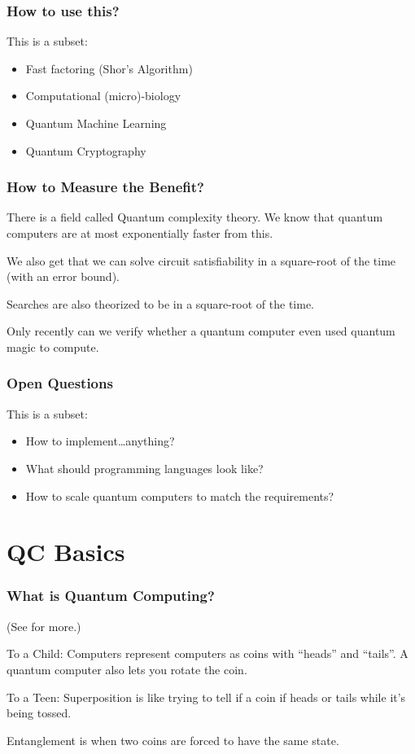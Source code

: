 \documentclass{beamer}
\begin{document}
\begin{frame}
\frametitle{How to use this?}
This is a subset:
\begin{itemize}
    \item Fast factoring (Shor's Algorithm)
    \item Computational (micro)-biology
    \item Quantum Machine Learning
    \item Quantum Cryptography
\end{itemize}
\end{frame}

\begin{frame}
\frametitle{How to Measure the Benefit?}
There is a field called Quantum complexity theory. We know that quantum computers are at most exponentially faster
from this.

We also get that we can solve circuit satisfiability in a square-root of the time (with an error bound).

Searches are also theorized to be in a square-root of the time. \cite{q-complexity}

Only recently can we verify whether a quantum computer even used quantum magic to compute. \cite{q-verification}
\end{frame}

\begin{frame}
\frametitle{Open Questions}
This is a subset:
\begin{itemize}
    \item How to implement\dots anything?
    \item What should programming languages look like?
    \item How to scale quantum computers to match the requirements?
\end{itemize}
\end{frame}

\section{QC Basics}

\begin{frame}
\frametitle{What is Quantum Computing?}

(See \cite{5-levels} for more.)

\begin{block}{To a Child:}
Computers represent computers as coins with ``heads'' and ``tails''. A quantum computer also lets you rotate the coin.
\end{block}

\begin{block}{To a Teen:}
Superposition is like trying to tell if a coin if heads or tails while it's being tossed.

Entanglement is when two coins are forced to have the same state.
\end{block}
\end{frame}
\end{document}
